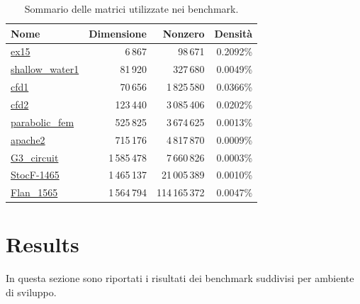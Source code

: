 \documentclass{report}
\begin{document}
            \begin{table}[h]
                \centering
                
                \begin{tabular}{@{}lrrr@{}}
                \toprule
                \textbf{Nome}   
                & \textbf{Dimensione} & \textbf{Nonzero} & \textbf{Densità} \\ 
                \midrule
                \href{https://sparse.tamu.edu/FIDAP/ex15}{ex15}            
                & 6\,867         & 98\,671          & 0.2092\%         \\
                \href{https://sparse.tamu.edu/MaxPlanck/shallow_water1}{shallow\_water1} 
                & 81\,920        & 327\,680         & 0.0049\%         \\ 
                \href{https://sparse.tamu.edu/Rothberg/cfd1}{cfd1}            
                & 70\,656        & 1\,825\,580      & 0.0366\%         \\
                \href{https://sparse.tamu.edu/Rothberg/cfd2}{cfd2}            
                & 123\,440       & 3\,085\,406      & 0.0202\%         \\
                \href{https://sparse.tamu.edu/Wissgott/parabolic_fem}{parabolic\_fem}  
                & 525\,825       & 3\,674\,625      & 0.0013\%         \\
                \href{https://sparse.tamu.edu/GHS_psdef/apache2}{apache2}         
                & 715\,176       & 4\,817\,870      & 0.0009\%         \\
                \href{https://sparse.tamu.edu/AMD/G3_circuit}{G3\_circuit}     
                & 1\,585\,478    & 7\,660\,826      & 0.0003\%         \\
                \href{https://sparse.tamu.edu/Janna/StocF-1465}{StocF-1465}      
                & 1\,465\,137    & 21\,005\,389     & 0.0010\%         \\
                \href{https://sparse.tamu.edu/Janna/Flan_1565}{Flan\_1565}      
                & 1\,564\,794    & 114\,165\,372    & 0.0047\%         \\
                \bottomrule
                \end{tabular}%
                
                \caption{Sommario delle matrici utilizzate nei benchmark.}
                \label{tab:matrices}
                \end{table}
        
        \section{Results}
            In questa sezione sono riportati i risultati dei benchmark suddivisi per ambiente di sviluppo.
\end{document}
